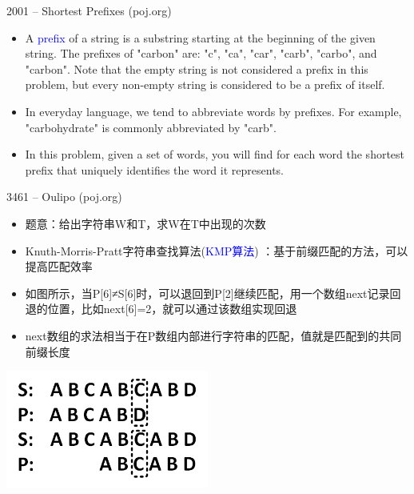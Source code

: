 \begin{frame}{2001 -- Shortest Prefixes (poj.org)}
    \begin{itemize}
        \item A \textcolor{blue}{prefix} of a string is a substring starting at the beginning of the given string. The prefixes of "carbon" are: "c", "ca", "car", "carb", "carbo", and "carbon". Note that the empty string is not considered a prefix in this problem, but every non-empty string is considered to be a prefix of itself.
        \item In everyday language, we tend to abbreviate words by prefixes. For example, "carbohydrate" is commonly abbreviated by "carb".
        \item In this problem, given a set of words, you will find for each word the shortest prefix that uniquely identifies the word it represents.
    \end{itemize}
\end{frame}
\begin{frame}{3461 -- Oulipo (poj.org)}
    \begin{itemize}
        \item 题意：给出字符串W和T，求W在T中出现的次数
        \item Knuth-Morris-Pratt字符串查找算法(\textcolor{blue}{KMP算法}) ：基于前缀匹配的方法，可以提高匹配效率
        \item 如图所示，当P[6]≠S[6]时，可以退回到P[2]继续匹配，用一个数组next记录回退的位置，比如next[6]=2，就可以通过该数组实现回退
        \item next数组的求法相当于在P数组内部进行字符串的匹配，值就是匹配到的共同前缀长度
    \end{itemize}
    \includegraphics[width=0.5\textwidth,center]{fig/6-10.png}
\end{frame}
